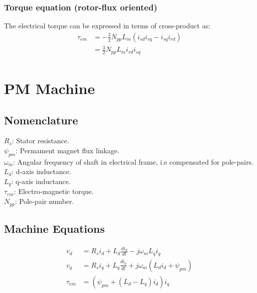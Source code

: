 \documentclass[]{book}
\begin{document}
\hypertarget{torque-equation-rotor-flux-oriented}{%
\subsection{Torque equation (rotor-flux oriented)}\label{torque-equation-rotor-flux-oriented}}

The electrical torque can be expressed in terms of cross-product as:
\[
\begin{aligned}
\tau_{em} &= - \frac{3}{2}N_{pp}L_m(i_{sd}i_{rq} -  i_{sq}i_{rd}) \\
&=  \frac{3}{2}N_{pp}L_m i_{rd}  i_{sq} \\
\end{aligned}
\label{eq:rotorFluxTorque1}
\]

\hypertarget{pm-machine}{%
\chapter{PM Machine}\label{pm-machine}}

\hypertarget{nomenclature-1}{%
\section{Nomenclature}\label{nomenclature-1}}

\(R_s\): Stator resistance.\\
\(\psi_{pm}\): Permament magnet flux linkage.\\
\(\omega_m\): Angular frequency of shaft in electrical frame, i.e compensated for pole-pairs.\\
\(L_d\): d-axis inductance.\\
\(L_q\): q-axis inductance.\\
\(\tau_{em}\): Electro-magnetic torque.\\
\(N_{pp}\): Pole-pair number.

\hypertarget{machine-equations}{%
\section{Machine Equations}\label{machine-equations}}

\[
\begin{aligned}
v_d & = R_s i_d + L_d\frac{di_d}{dt} - j \omega_m L_q i_q  \\
v_q & = R_s i_q + L_q\frac{di_q}{dt} + j \omega_m (L_d i_d + \psi_{pm})  \\
\tau_{em} & =  (\psi_{pm} + (L_d-L_q) i_d)i_q  \\
\end{aligned}
\label{eq:pmsmMdl1}
\]
\end{document}
